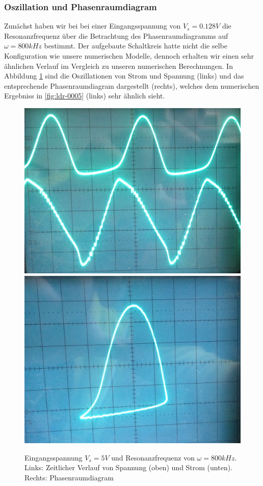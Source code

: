 \documentclass{scrartcl}
\begin{document}
\subsubsection { Oszillation und Phasenraumdiagram }
Zunächst haben wir bei bei einer Eingangsspannung von $V_s=0.128V$ die Resonanzfrequenz über die Betrachtung des Phasenraumdiagramms auf $\omega=800kHz$ bestimmt. 
Der aufgebaute Schaltkreis hatte nicht die selbe Konfiguration wie unsere numerischen Modelle, dennoch erhalten wir einen sehr ähnlichen Verlauf im Vergleich zu unseren numerischen Berechnungen. In Abbildung \ref{fig:ldr-real1} sind die Oszillationen von Strom und Spannung (links) und das entsprechende Phasenraumdiagram dargestellt (rechts), welches dem numerischen Ergebniss in \ref{fig:ldr-0005} (links) sehr ähnlich sieht. 
\begin{figure}
\centering
\includegraphics[scale=0.1]{800khz-5V-oszi}
\includegraphics[scale=0.11]{800khz-5V-phase}
\caption{Eingangsspannung $V_s=5V$ und Resonanzfrequenz von $\omega=800kHz$. Links: Zeitlicher Verlauf von Spannung (oben) und Strom (unten). Rechts: Phasenraumdiagram}
\label{fig:ldr-real1}
\end{figure}
\end{document}
